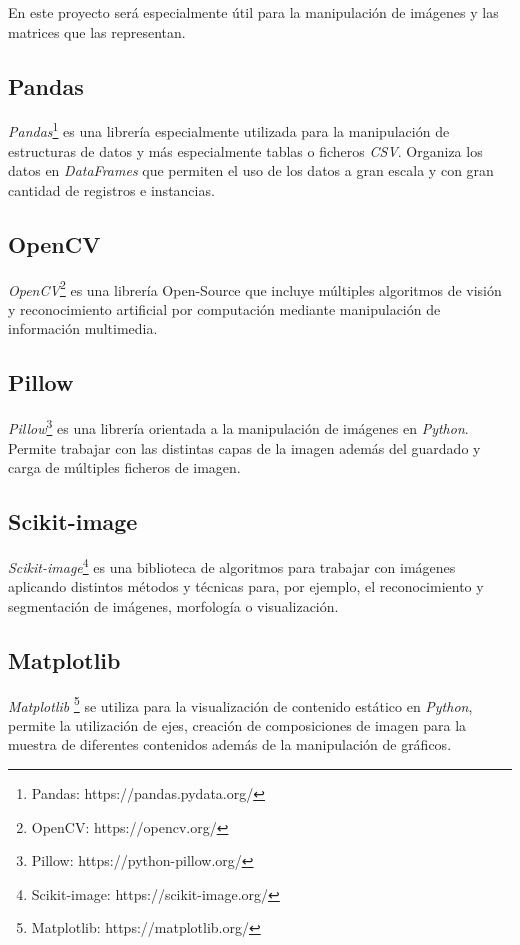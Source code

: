 En este proyecto será especialmente útil para la manipulación de imágenes y las matrices que las representan.

\subsection{Pandas}
\emph{Pandas}\footnote{Pandas: https://pandas.pydata.org/} es una librería especialmente utilizada para la manipulación de estructuras de datos y más especialmente tablas o ficheros \emph{CSV}. Organiza los datos en \emph{DataFrames} que permiten el uso de los datos a gran escala y con gran cantidad de registros e instancias. 

\subsection{OpenCV}
\emph{OpenCV}\footnote{OpenCV: https://opencv.org/} es una librería Open-Source que incluye múltiples algoritmos de visión y reconocimiento artificial por computación mediante manipulación de información multimedia.

\subsection{Pillow}
\emph{Pillow}\footnote{Pillow: https://python-pillow.org/} es una librería orientada a la manipulación de imágenes en \emph{Python}. Permite trabajar con las distintas capas de la imagen además del guardado y carga de múltiples ficheros de imagen.

\subsection{Scikit-image}
\emph{Scikit-image}\footnote{Scikit-image: https://scikit-image.org/} es una biblioteca de algoritmos para trabajar con imágenes aplicando distintos métodos y técnicas para, por ejemplo, el reconocimiento y segmentación de imágenes, morfología o visualización.

\subsection{Matplotlib}
\emph{Matplotlib} \footnote{Matplotlib: https://matplotlib.org/} se utiliza para la visualización de contenido estático en \emph{Python}, permite la utilización de ejes, creación de composiciones de imagen para la muestra de diferentes contenidos además de la manipulación de gráficos.

